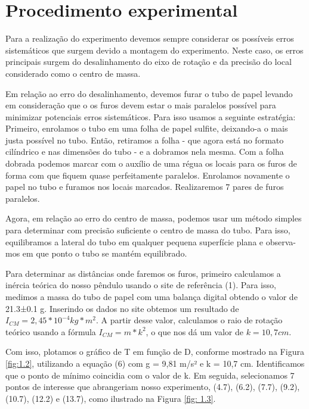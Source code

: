\documentclass[hidelinks,a4paper,12pt]{article}
\begin{document}
\section*{Procedimento experimental}

\qquad Para a realização do experimento devemos sempre considerar os possíveis erros sistemáticos que surgem devido a montagem do experimento. Neste caso, os erros principais surgem do desalinhamento do eixo de rotação e da precisão do local considerado como o centro de massa.

\qquad Em relação ao erro do desalinhamento, devemos furar o tubo de papel levando em consideração que o os furos devem estar o mais paralelos possível para minimizar potenciais erros sistemáticos. Para isso usamos a seguinte estratégia: Primeiro, enrolamos o tubo em uma folha de papel sulfite, deixando-a o mais justa possível no tubo. Então, retiramos a folha - que agora está no formato cilíndrico e nas dimensões do tubo - e a dobramos nela mesma. Com a folha dobrada podemos marcar com o auxílio de uma régua os locais para os furos de forma com que fiquem quase perfeitamente paralelos. Enrolamos novamente o papel no tubo e furamos nos locais marcados. Realizaremos 7 pares de furos paralelos.

\quad Agora, em relação ao erro do centro de massa, podemos usar um método simples para determinar com precisão suficiente o centro de massa do tubo. Para isso, equilibramos a lateral do tubo em qualquer pequena superfície plana e observa-mos em que ponto o tubo se mantém equilibrado.

\quad Para determinar as distâncias onde faremos os furos, primeiro calculamos a inércia teórica do nosso pêndulo usando o site de referência (1). Para isso, medimos a massa do tubo de papel com uma balança digital obtendo o valor de 21.3±0.1 g. Inserindo os dados no site obtemos um resultado de $I_{CM} = 2,45 * 10^{-4} kg*m^2$. A partir desse valor, calculamos o raio de rotação teórico usando a fórmula $I_{CM} = m * k^2$, o que nos dá um valor de $k = 10,7 cm$.   

\quad Com isso, plotamos o gráfico de T em função de D, conforme mostrado na Figura \ref{fig:1.2}, utilizando a equação (6) com g = 9,81 m/s² e k = 10,7 cm. Identificamos que o ponto de mínimo coincidia com o valor de k. Em seguida, selecionamos 7 pontos de interesse que abrangeriam nosso experimento, (4.7), (6.2), (7.7), (9.2), (10.7), (12.2) e (13.7), como ilustrado na Figura \ref{fig: 1.3}.
\end{document}
